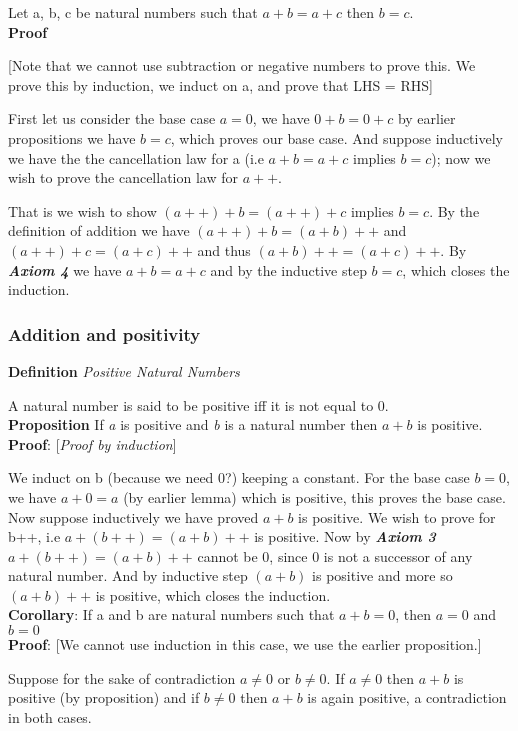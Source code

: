 \documentclass[10pt]{article}
\begin{document}
Let a, b, c be natural numbers such that $a + b = a + c$ then $ b = c $.
\\[3pt]
\textbf{Proof}

[Note that we cannot use subtraction or negative numbers to prove this. We prove
  this by induction, we induct on a, and prove that LHS = RHS]

First let us consider the base case $a = 0$, we have $0 + b = 0 + c$ by earlier
propositions we have $ b = c $, which proves our base case. And suppose
inductively we have the the cancellation law for a (i.e $a + b = a + c$ implies
$b = c$); now we wish to prove the cancellation law for $a++$.

That is we wish to show $(a++) + b = (a++) + c$ implies $b = c$. By the
definition of addition we have $(a++) + b = (a + b)++$ and $(a++) + c = (a+c)++$
and thus $(a + b)++ = (a + c)++$. By \emph{\textbf{Axiom 4}} we have $a + b = a
+ c$ and by the inductive step $b = c$, which closes the induction.

\subsubsection*{Addition and positivity}
\textbf{Definition} \emph{Positive Natural Numbers}

A natural number is said to be positive iff it is not equal to 0.
\\[6pt]
\textbf{Proposition}
If \emph{a} is positive and {\em b} is a natural number then $a + b$ is
positive.
\\[3pt]
\textbf{Proof}: [\emph{Proof by induction}]

We induct on b (because we need 0?) keeping a constant. For the base case
$b =0$, we have $a + 0 = a$ (by earlier lemma) which is positive, this proves
the base case. Now suppose inductively we have proved $a + b$ is positive. We
wish to prove for b++, i.e $a + (b++) = (a + b)++$ is positive.
Now by \emph{\textbf{Axiom 3}} $a + (b++) = (a + b)++$ cannot be 0, since 0 is
not a successor of any natural number. And by inductive step $(a+b)$ is positive
and more so $(a + b)++$ is positive, which closes the induction.
\\[6pt]
\textbf{Corollary}: If a and b are natural numbers such that $a + b = 0$, then
$a = 0$ and $ b = 0$
\\[3pt]
\textbf{Proof}: [We cannot use induction in this case, we use the earlier
  proposition.]

Suppose for the sake of contradiction $ a \ne 0$ or $b \ne 0$. If $a \ne 0$ then
$a + b$ is positive (by proposition) and if $b \ne 0$ then $a+b$ is again
positive, a contradiction in both cases.
\end{document}

